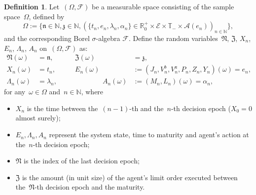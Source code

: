 \documentclass{amsart}[11pt]
\numberwithin{equation}{section}
\theoremstyle{definition}
\newtheorem{definition}[theorem]{Definition}
\newcommand{\RR}{\mathbb{R}}
\newcommand{\NN}{\mathbb{N}}
\newcommand{\Ee}{\mathcal{E}}
\newcommand{\Nn}{\mathfrak{N}}
\newcommand{\TT}{\mathbb{T}}
\newcommand{\nn}{\mathfrak{n}}
\newcommand{\ZZ}{\mathfrak{Z}}
\newcommand{\zz}{\mathfrak{z}}
\newcommand{\Aa}{\mathcal{A}}
\begin{document}
\begin{definition}\label{def: measurablespace}
Let~$(\Omega, \mathcal{F})$ be a measurable space consisting of the sample space~$\Omega$,
defined by
$$
\Omega := \Big\{\nn\in\NN, \zz\in\NN, \left(\{t_n, e_n, \lambda_n, \alpha_n\} 
\in\RR^+_0\times \Ee\times\TT_- \times\Aa(e_n)\right)_{n \in \NN}
\Big\},
$$
and the corresponding Borel $\sigma$-algebra $\mathcal{F}$.
Define the random variables~$\Nn$, $\ZZ$, $X_n$, $E_n$, $\Lambda_n$, $A_n$ on~$(\Omega, \mathcal{F})$ as:
\begin{equation*}
\begin{array}{rlrl}
\Nn(\omega) & = \nn, \qquad  & \ZZ(\omega) & = \zz,\\
X_n(\omega) & = t_n, \qquad & E_n(\omega) & := \left(J_n, V^b_n, V^a_n, P_n, Z_n, Y_n\right)(\omega) = e_n,\\
\Lambda_n(\omega) & = \lambda_n, & \qquad \qquad A_n(\omega) & :=\left(M_n, L_n\right)(\omega) = \alpha_n,
\end{array}
\end{equation*}
for any~$\omega\in\Omega$ and~$n\in\NN$,
where
\begin{itemize}
\item $X_n$ is the time between the~$(n-1)$-th and the~$n$-th decision epoch
($X_0 = 0$ almost surely);
\item $E_n, \Lambda_n, A_n$ represent the system state, time to maturity and agent's action at the~$n$-th decision epoch;
\item $\Nn$ is the index of the last decision epoch;
\item $\ZZ$ is the amount (in unit size) of the agent's limit order executed between the~$\Nn$-th decision epoch and the maturity.
\end{itemize}
\end{definition}

\end{document}
